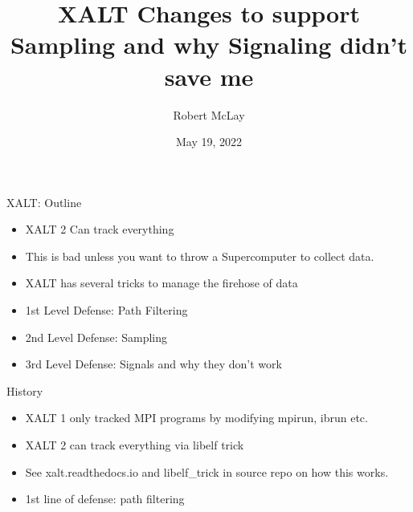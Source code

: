 \documentclass{beamer}
\begin{document}
\title[XALT]{XALT Changes to support Sampling and why Signaling didn't
save me}
\author{Robert McLay}
\date{May 19, 2022}

\frame{\titlepage}

\begin{frame}{XALT: Outline}
  \begin{itemize}
    \item XALT 2 Can track everything 
    \item This is bad unless you want to throw a Supercomputer to
      collect data.
    \item XALT has several tricks to manage the firehose of data
    \item 1st Level Defense: Path Filtering
    \item 2nd Level Defense: Sampling
    \item 3rd Level Defense: Signals and why they don't work
  \end{itemize}
\end{frame}

\begin{frame}{History}
  \begin{itemize}
    \item XALT 1 only tracked MPI programs by modifying mpirun, ibrun etc.
    \item XALT 2 can track everything via libelf trick
    \item See xalt.readthedocs.io and libelf_trick in source repo on
      how this works.
    \item 1st line of defense: path filtering
  \end{itemize}
\end{frame}
\end{document}
